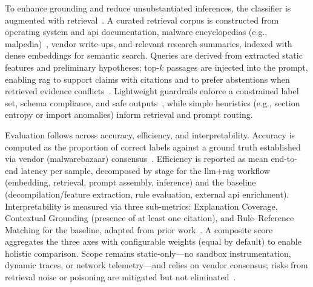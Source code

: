 To enhance grounding and reduce unsubstantiated inferences, the classifier is augmented with
retrieval~\cite{lewis2020retrieval,gao2023retrieval}. A curated retrieval corpus is constructed
from operating system and \gls{api} documentation, malware encyclopedias (e.g.,
\gls{malpedia})~\cite{plohmann2017malpedia}, vendor write-ups, and relevant research summaries,
indexed with dense embeddings for semantic search. Queries are derived from extracted static
features and preliminary hypotheses; top-$k$ passages are injected into the prompt, enabling
\gls{rag} to support claims with citations and to prefer abstentions when retrieved evidence
conflicts~\cite{bechard2024reducing,zhang2025hallucination}. Lightweight guardrails enforce a
constrained label set, schema compliance, and safe outputs~\cite{han2025guardrail}, while simple
heuristics (e.g., section entropy or import anomalies) inform retrieval and prompt routing.

Evaluation follows across accuracy, efficiency, and interpretability. Accuracy is computed as the
proportion of correct labels against a ground truth established via vendor (\gls{malwarebazaar})
consensus~\cite{gaber2024malware,wong2021practice}. Efficiency is reported as mean end-to-end
latency per sample, decomposed by stage for the \gls{llm}+\gls{rag} workflow (embedding, retrieval,
prompt assembly, inference) and the baseline (decompilation/feature extraction, rule evaluation,
external \gls{api} enrichment). Interpretability is measured via three sub-metrics: Explanation
Coverage, Contextual Grounding (presence of at least one citation), and Rule–Reference Matching for
the baseline, adapted from prior work~\cite{sahoo2024systematic,wong2021practice}. A composite
score aggregates the three axes with configurable weights (equal by default) to enable holistic
comparison. Scope remains static-only—no sandbox instrumentation, dynamic traces, or network
telemetry—and relies on vendor consensus; risks from retrieval noise or poisoning are mitigated but
not eliminated~\cite{ormeir2019dynamic,zou2024poisonedrag}.


